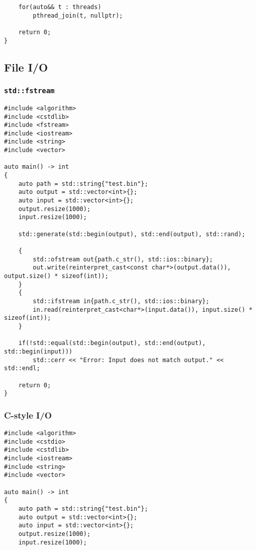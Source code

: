 \begin{appendix}
\begin{verbatim}
    for(auto&& t : threads)
        pthread_join(t, nullptr);
        
    return 0;
}
\end{verbatim}

\subsection{File I/O}

\subsubsection{\texttt{std::fstream}}\label{app:scorep_fstream}

\begin{verbatim}
#include <algorithm>
#include <cstdlib>
#include <fstream>
#include <iostream>
#include <string>
#include <vector>

auto main() -> int
{
    auto path = std::string{"test.bin"};
    auto output = std::vector<int>{};
    auto input = std::vector<int>{};
    output.resize(1000);
    input.resize(1000);
    
    std::generate(std::begin(output), std::end(output), std::rand);
    
    {
        std::ofstream out{path.c_str(), std::ios::binary};
        out.write(reinterpret_cast<const char*>(output.data()), output.size() * sizeof(int));
    }
    {
        std::ifstream in{path.c_str(), std::ios::binary};
        in.read(reinterpret_cast<char*>(input.data()), input.size() * sizeof(int));
    }
    
    if(!std::equal(std::begin(output), std::end(output), std::begin(input)))
        std::cerr << "Error: Input does not match output." << std::endl;
        
    return 0;
}
\end{verbatim}

\subsubsection{C-style I/O}\label{app:scorep_c_io}

\begin{verbatim}
#include <algorithm>
#include <cstdio>
#include <cstdlib>
#include <iostream>
#include <string>
#include <vector>

auto main() -> int
{
    auto path = std::string{"test.bin"};
    auto output = std::vector<int>{};
    auto input = std::vector<int>{};
    output.resize(1000);
    input.resize(1000);
    

\end{verbatim}
\end{appendix}
